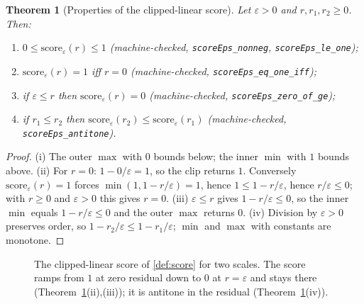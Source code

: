 \documentclass[11pt,a4paper]{article}
\newtheorem{theorem}{Theorem}[section]
\begin{document}
\begin{theorem}[Properties of the clipped-linear score]
\label{thm:score}
Let $\varepsilon > 0$ and $r, r_1, r_2 \ge 0$.
Then:
\begin{enumerate}[label=\textup{(\roman*)},nosep]
\item $0 \le \mathrm{score}_\varepsilon(r) \le 1$
  (machine-checked, \texttt{scoreEps\_nonneg},
  \texttt{scoreEps\_le\_one});
\item $\mathrm{score}_\varepsilon(r) = 1$ iff $r = 0$
  (machine-checked, \texttt{scoreEps\_eq\_one\_iff});
\item if $\varepsilon \le r$ then $\mathrm{score}_\varepsilon(r) = 0$
  (machine-checked, \texttt{scoreEps\_zero\_of\_ge});
\item if $r_1 \le r_2$ then
  $\mathrm{score}_\varepsilon(r_2) \le \mathrm{score}_\varepsilon(r_1)$
  (machine-checked, \texttt{scoreEps\_antitone}).
\end{enumerate}
\end{theorem}
\begin{proof}
(i) The outer $\max$ with $0$ bounds below; the inner $\min$ with $1$
bounds above.
(ii) For $r = 0$: $1 - 0/\varepsilon = 1$, so the clip returns $1$.
Conversely $\mathrm{score}_\varepsilon(r) = 1$ forces
$\min(1, 1 - r/\varepsilon) = 1$, hence $1 \le 1 - r/\varepsilon$,
hence $r/\varepsilon \le 0$; with $r \ge 0$ and $\varepsilon > 0$ this
gives $r = 0$.
(iii) $\varepsilon \le r$ gives $1 - r/\varepsilon \le 0$, so the inner
$\min$ equals $1 - r/\varepsilon \le 0$ and the outer $\max$ returns
$0$.
(iv) Division by $\varepsilon > 0$ preserves order, so
$1 - r_2/\varepsilon \le 1 - r_1/\varepsilon$; $\min$ and $\max$ with
constants are monotone.
\end{proof}

\begin{figure}[ht]
\centering
{}
\caption{The clipped-linear score of \cref{def:score} for two scales.
The score ramps from $1$ at zero residual down to $0$ at
$r = \varepsilon$ and stays there (Theorem~\ref{thm:score}(ii),(iii));
it is antitone in the residual (Theorem~\ref{thm:score}(iv)).}
\label{fig:score}
\end{figure}
\end{document}
